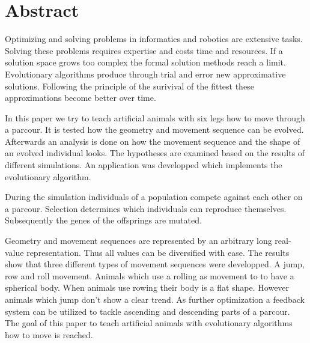 %
%


\chapter{Abstract}

  Optimizing and solving problems in informatics and robotics are extensive tasks.
  Solving these problems requires expertise and costs time and resources.
  If a solution space grows too complex the formal solution methods reach a limit.
  Evolutionary algorithms produce through trial and error new approximative solutions.
  Following the principle of the surivival of the fittest these approximations become better over time.

  \smallskip

  In this paper we try to teach artificial animals with six legs how to move through a parcour.
  It is tested how the geometry and movement sequence can be evolved.
  Afterwards an analysis is done on how the movement sequence and the shape of an evolved individual looks.
  The hypotheses are examined based on the results of different simulations.
  An application was developped which implements the evolutionary algorithm.

  \smallskip

  During the simulation individuals of a population compete against each other on a parcour.
  Selection determines which individuals can reproduce themselves.
  Subsequently the genes of the offsprings are mutated.

  \smallskip

  Geometry and movement sequences are represented by an arbitrary long real-value representation.
  Thus all values can be diversified with ease.
  The results show that three different types of movement sequences were developped.
  A jump, row and roll movement. Animals which use a rolling as movement to to have a spherical body.
  When animals use rowing their body is a flat shape. However animals which jump don't show a clear trend.
  As further optimization a feedback system can be utilized to tackle ascending and descending parts of a parcour.
  \\
  The goal of this paper to teach artificial animals with evolutionary algorithms how to move is reached.
